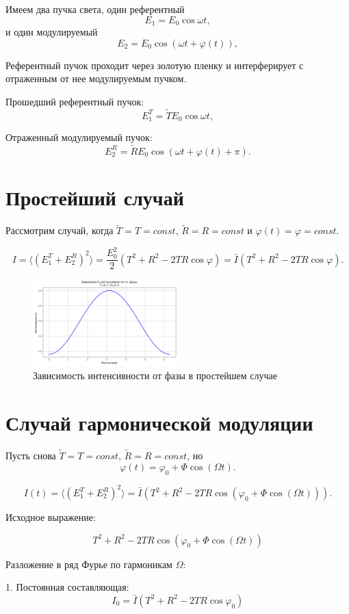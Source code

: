 \documentclass[a4paper, 12pt]{article}
\renewcommand{\phi}{\varphi}
\begin{document}
Имеем два пучка света, один референтный
\[E_1 = E_0 \cos\omega t,\]
и один модулируемый
\[E_2 = E_0 \cos(\omega t + \phi(t)),\]

Референтный пучок проходит через золотую пленку и интерферирует с отраженным от нее модулируемым пучком.

Прошедший референтный пучок:
\[E_1^T = \tilde T E_0 \cos\omega t,\]

Отраженный модулируемый пучок:
\[E_2^R = \tilde R E_0 \cos(\omega t + \phi(t) + \pi).\]

\section{Простейший случай}
Рассмотрим случай, когда $\tilde T = T = const$, $\tilde R = R = const$ и $\phi(t) = \phi = const$.

\[I = \langle (E_1^T + E_2^R)^2 \rangle = \frac{E_0^2}{2} \left( T^2 + R^2 - 2 T R \cos\phi \right) = \bar{I} (T^2 + R^2 - 2 T R \cos\phi).\]

\begin{figure}[H]
  \centering
  \includegraphics[width=0.5\textwidth]{../figures/intensity_vs_phase_T0.7_R0.3.png}
  \caption{Зависимость интенсивности от фазы в простейшем случае}
\end{figure}

\section{Случай гармонической модуляции}
Пусть снова $\tilde T = T = const$, $\tilde R = R = const$, но
\[\phi(t) = \phi_0 + \Phi \cos(\Omega t).\]

\[I(t) = \langle (E_1^T + E_2^R)^2 \rangle = \bar{I} \left( T^2 + R^2 - 2 T R \cos(\phi_0 + \Phi \cos(\Omega t)) \right).\]

Исходное выражение:

\[
  T^2 + R^2 - 2 T R \cos\left(\phi_0 + \Phi \cos(\Omega t)\right)
\]

Разложение в ряд Фурье по гармоникам \(\Omega\):

1. Постоянная составляющая:
\[
  I_0 = \bar{I} (T^2 + R^2 - 2 T R \cos\phi_0)
\]
\end{document}
